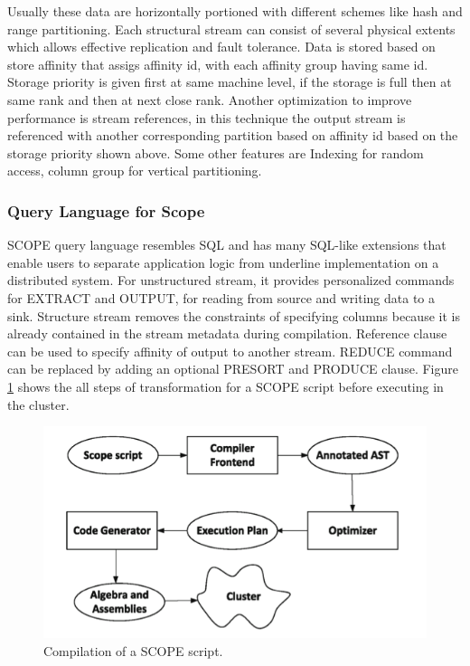 \documentclass[runningheads,a4paper]{llncs}
\begin{document}
{Usually these data are horizontally portioned with different schemes like hash and range partitioning. Each structural stream can consist of several physical extents which allows effective replication and fault tolerance. Data is stored based on store affinity that assigs affinity id, with each affinity group having same id. Storage priority is given first at same machine level, if the storage is full then at same rank and then at next close rank.  Another optimization to improve performance is stream references, in this technique the output stream is referenced with another corresponding partition based on affinity id based on the storage priority shown above. Some other features are Indexing for random access, column group for vertical partitioning.  \\

\subsubsection{Query Language for Scope}
SCOPE query language resembles SQL and has many SQL-like extensions that enable users to separate application logic from underline implementation on a distributed system. For unstructured stream, it provides personalized commands for EXTRACT and OUTPUT, for reading from source and writing data to a sink. Structure stream removes the constraints of specifying columns because it is already contained in the stream metadata during compilation. Reference clause can be used to specify affinity of output to another stream. REDUCE command can be replaced by adding an optional PRESORT and PRODUCE clause. Figure \ref{fig:compilation_of_a_scope} shows the all steps of transformation for a SCOPE script before executing in the cluster. 

\begin{figure}[!htb]
	\includegraphics[scale=1]{./images/krunal2}
	\centering
	\caption{Compilation of a SCOPE script.}
	\label{fig:compilation_of_a_scope}
\end{figure}

}
\end{document}
